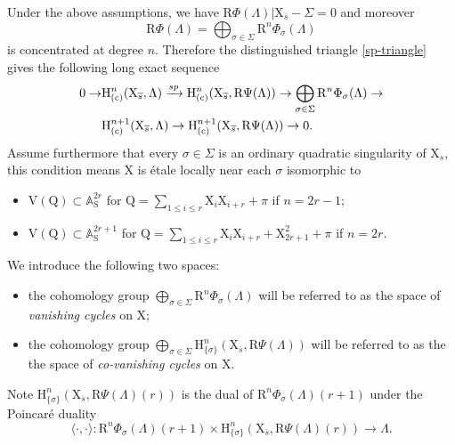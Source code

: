 \documentclass[10pt]{amsart}
\numberwithin{equation}{section}
\theoremstyle{definition}
\def\rmc{\mathrm{c}}
\def\rmH{\mathrm{H}}
\def\rmV{\mathrm{V}}
\def\rmR{\mathrm{R}}
\def\rmS{\mathrm{S}}
\def\rmX{\mathrm{X}}
\begin{document}
Under the above assumptions, we have $\rmR\Phi(\Lambda)|\rmX_{\overline{s}}-\Sigma=0$ and moreover
\begin{equation*}
\rmR\Phi(\Lambda)=\bigoplus_{\sigma\in \Sigma} \rmR^{n}\Phi_{\sigma}(\Lambda)
\end{equation*}
is concentrated at degree $n$. Therefore the distinguished triangle \eqref{sp-triangle} gives the following long  exact sequence
\begin{equation}\label{sp-exact}
\begin{split}
0\rightarrow &\mathrm{H}^{n}_{(\rmc)}(\rmX_{\overline{s}}, \Lambda)\xrightarrow{\rm{sp}}  \mathrm{H}^{n}_{(\rmc)}(\rmX_{\overline{s}}, \rmR\Psi(\Lambda)) \rightarrow \bigoplus_{\sigma\in \Sigma} \rmR^{n}\Phi_{\sigma}(\Lambda)\rightarrow\\ 
&\mathrm{H}^{n+1}_{(\rmc)}(\rmX_{\overline{s}},\Lambda)\rightarrow \mathrm{H}^{n+1}_{(\rmc)}(\rmX_{\overline{s}}, \rmR\Psi(\Lambda))\rightarrow 0.
\end{split}
\end{equation}
Assume furthermore that every $\sigma\in \Sigma$ is an {ordinary quadratic singularity} of $\rmX_{s}$, this condition means $\rmX$ is \'{e}tale locally near each $\sigma$ isomorphic to 
\begin{itemize}
\item  $\rmV(\mathrm{Q})\subset \mathbb{A}^{2r}_{\rmS}$  for $\mathrm{Q}=\sum\limits_{1\leq i\leq r}\rmX_{i}\rmX_{i+r}+\pi$ if $n=2r-1$;
\item  $\rmV(\mathrm{Q})\subset \mathbb{A}^{2r+1}_{\rmS}$  for $\mathrm{Q}=\sum\limits_{1\leq i\leq r}\rmX_{i}\rmX_{i+r}+\rmX^{2}_{2r+1}+\pi$ if $n=2r$.
\end{itemize}

We introduce the following two spaces:
\begin{itemize}
\item the cohomology group $\bigoplus\limits_{\sigma\in\Sigma}\rmR^{n}\Phi_{\sigma}(\Lambda)$ will be referred to as the space of {\em vanishing cycles} on $\rmX$; 
\item the cohomology group $\bigoplus\limits_{\sigma\in \Sigma}\rmH^{n}_{\{\sigma\}}(\rmX_{\overline{s}}, \rmR\Psi(\Lambda))$ will be referred to as the
the space of {\em  co-vanishing cycles} on $\rmX$.
\end{itemize}
Note $\rmH^{n}_{\{\sigma\}}(\rmX_{\overline{s}}, \rmR\Psi(\Lambda)(r))$ is the dual of $\rmR^{n}\Phi_{\sigma}(\Lambda)(r+1)$ under the Poincar\'e duality
\begin{equation*}
\langle\cdot,\cdot\rangle: \rmR^{n}\Phi_{\sigma}(\Lambda)(r+1)\times \rmH^{n}_{\{\sigma\}}(\rmX_{\overline{s}}, \rmR\Psi(\Lambda)(r))\rightarrow \Lambda.
\end{equation*}
\end{document}
